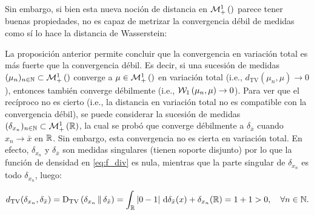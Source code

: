 Sin embargo, si bien esta nueva noción de distancia en $\mathcal{M}_+^1\left(\right)$ parece tener buenas propiedades, no es capaz de metrizar la convergencia débil de medidas como sí lo hace la distancia de Wasserstein:


La proposición anterior permite concluir que la convergencia en variación total es más fuerte que la convergencia débil. Es decir, si una sucesión de medidas $(\mu_n)_{n\in\mathbb{N}}\subset\mathcal{M}_+^1\left(\right)$ converge a $\mu\in\mathcal{M}_+^1\left(\right)$ en variación total (i.e., $d_{\operatorname{TV}}(\mu_n,\mu)\to 0$), entonces también converge débilmente (i.e., $\mathcal{W}_{1}\left(\mu_n,\mu\right)\to 0$). Para ver que el recíproco no es cierto (i.e., la distancia en variación total no es compatible con la convergencia débil), se puede considerar la sucesión de medidas $(\delta_{x_n})_{n\in\mathbb{N}}\subset\mathcal{M}_+^1\left(\mathbb{R}\right)$, la cual se probó que converge débilmente a $\delta_{\bar x}$ cuando $x_n\to\bar x$ en $\mathbb{R}$. Sin embargo, esta convergencia no es cierta en variación total. En efecto, $\delta_{x_n}$ y $\delta_{\bar x}$ son medidas singulares (tienen soporte disjunto) por lo que la función de densidad en \eqref{eq:f_div} es nula, mientras que la parte singular de $\delta_{x_n}$ es todo $\delta_{x_n}$, luego:

\begin{equation*}
	d_{\operatorname{TV}}(\delta_{x_n},\delta_{\bar x})
	= \operatorname{D_{TV}}\left(\delta_{x_n}\,\|\,\delta_{\bar x}\right)
	= \int_{\mathbb{R}} |0 - 1| \,\operatorname{d}\!\delta_{\bar x}(x) + \delta_{x_n}(\mathbb{R})
	= 1 + 1 > 0,
	\quad\forall n\in\mathbb{N} .
\end{equation*}

